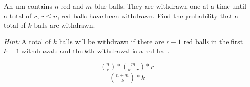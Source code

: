 \item An urn contains $n$ red and $m$ blue balls. They are withdrawn one at a time until a total of $r$, $r \le n$, red balls have been withdrawn. Find the probability that a total of $k$ balls are withdrawn.

\emph{Hint:} A total of $k$ balls will be withdrawn if there are $r - 1$ red balls in the first $k - 1$ withdrawals and the $k$th withdrawal is a red ball.

\[ \frac{\binom{n}{r} * \binom{m}{k-r} * r}{\binom{n+m}{k} * k} \]